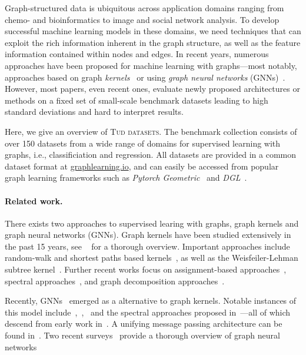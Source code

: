 \documentclass{article}
\theoremstyle{definition}
\newcommand{\new}[1]{\emph{#1}}
\begin{document}
Graph-structured data is ubiquitous across application domains ranging from chemo- and bioinformatics to image and social network analysis. To develop successful machine learning models in these domains, we need techniques that can exploit the rich information inherent in the graph structure, as well as the feature information contained within nodes and edges. In recent years, numerous approaches have been proposed for machine learning with graphs---most notably, approaches based on graph \new{kernels}~\cite{Kri+2019} or using \new{graph neural networks} (GNNs)~\cite{Gil+2017}. However, most papers, even recent ones, evaluate newly proposed architectures or methods on a fixed set of small-scale benchmark datasets leading to high standard deviations and hard to interpret results. 

Here, we give an overview of \textsc{Tud datasets}. The benchmark collection consists of over 150 datasets from a wide range of domains for supervised learning with graphs, i.e., classificiation and regression. All datasets are provided in a common dataset format at \url{graphlearning.io}, and can easily be accessed from popular graph learning frameworks such as \emph{Pytorch Geometric}~\cite{Fey+2019} and \emph{DGL}~\cite{Wan+2019}.

\paragraph{Related work.}

There exists two approaches to supervised learing with graphs, graph kernels and graph neural networks (GNNs). Graph kernels have been studied extensively in the past 15 years, see ~\cite{Kri+2019} for a thorough overview. 
Important approaches include random-walk and shortest paths based kernels~\cite{Gaertner2003,Sugiyama2015,Bor+2005,Kri+2017b}, as well as the Weisfeiler-Lehman subtree kernel~\cite{She+2011,Mor+2017}. 
Further recent works focus on assignment-based approaches~\cite{Kri+2016,Nik+2017}, spectral approaches~\cite{Kon+2016}, and graph decomposition approaches~\cite{Nik+2018}.

Recently, GNNs~\cite{Gil+2017} emerged as a alternative to graph kernels. Notable instances of this model include~\cite{Duv+2015},~\cite{Li+2016},~\cite{Ham+2017} and the spectral approaches proposed in~\cite{Bru+2014,Def+2015,Kip+2017}---all of which descend from early work in~\cite{Kir+1995,Mer+2005,Sca+2009}. A unifying message passing architecture can be found in~\cite{Gil+2017}. Two recent surveys~\cite{wu2019comprehensive,zhou2018graph} provide a thorough overview of graph neural networks
\end{document}
